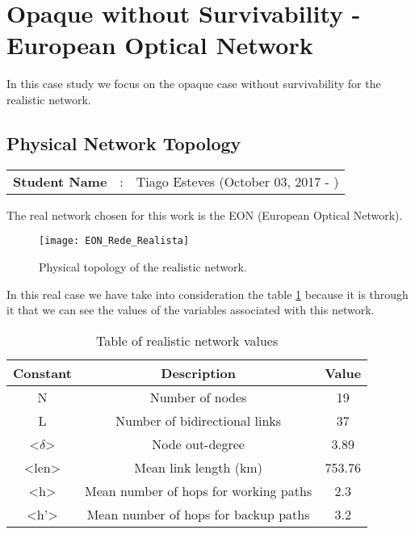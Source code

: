\newpage
\section{Opaque without Survivability - European Optical Network} \label{Realistic_Network}

In this case study we focus on the opaque case without survivability for the realistic network.

\subsection{Physical Network Topology}
\begin{tcolorbox}	
\begin{tabular}{p{2.75cm} p{0.2cm} p{10.5cm}} 	
\textbf{Student Name}  &:& Tiago Esteves    (October 03, 2017 - )\\
\end{tabular}
\end{tcolorbox}

The real network chosen for this work is the EON (European Optical Network).

\begin{figure}[h!]
\centering
\texttt{[image: EON\_Rede\_Realista]}
\caption{Physical topology of the realistic network.}
\end{figure}

In this real case we have take into consideration the table \ref{table_real_net} because it is through it that we can see the values of the variables associated with this network.

\begin{table}[h!]
\centering
\begin{tabular}{|| c | c | c||}
 \hline
 Constant & Description & Value \\
 \hline\hline
 N & Number of nodes & 19 \\
 L & Number of bidirectional links & 37 \\
 <$\delta$> & Node out-degree & 3.89 \\
 <len> & Mean link length (km) & 753.76 \\
 <h> & Mean number of hops for working paths & 2.3 \\
 <h'> & Mean number of hops for backup paths & 3.2 \\
 \hline
\end{tabular}
\caption{Table of realistic network values}
\label{table_real_net}
\end{table}

